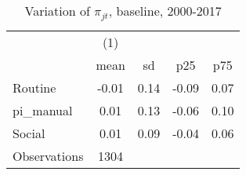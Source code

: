 \begin{table}[htbp]\centering
\def\sym#1{\ifmmode^{#1}\else\(^{#1}\)\fi}
\caption{Variation of $\pi_{jt}$, baseline, 2000-2017}
\begin{tabular}{l*{1}{cccc}}
\toprule
                    &\multicolumn{1}{c}{(1)}&            &            &            \\
                    &        mean&          sd&         p25&         p75\\
\midrule
Routine             &       -0.01&        0.14&       -0.09&        0.07\\
pi\_manual           &        0.01&        0.13&       -0.06&        0.10\\
Social              &        0.01&        0.09&       -0.04&        0.06\\
\midrule
Observations        &        1304&            &            &            \\
\bottomrule
\end{tabular}
\end{table}
